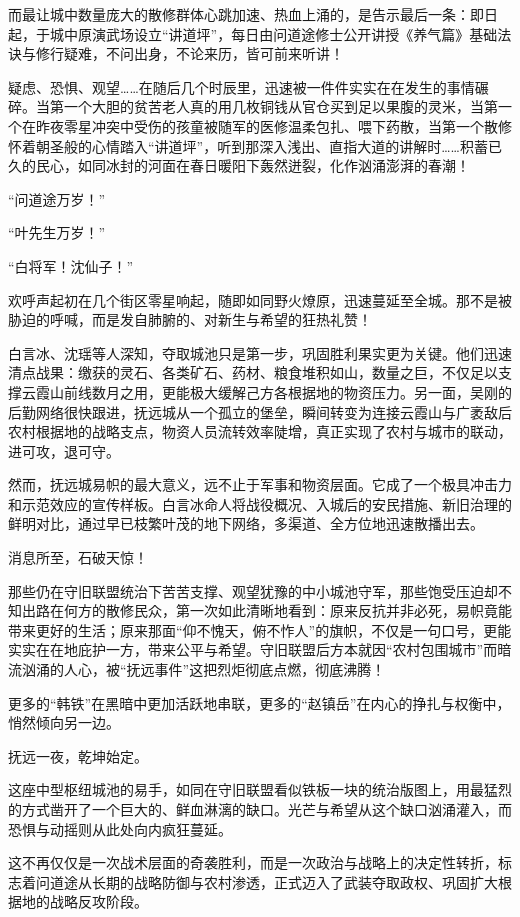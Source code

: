 而最让城中数量庞大的散修群体心跳加速、热血上涌的，是告示最后一条：即日起，于城中原演武场设立“讲道坪”，每日由问道途修士公开讲授《养气篇》基础法诀与修行疑难，不问出身，不论来历，皆可前来听讲！

疑虑、恐惧、观望……在随后几个时辰里，迅速被一件件实实在在发生的事情碾碎。当第一个大胆的贫苦老人真的用几枚铜钱从官仓买到足以果腹的灵米，当第一个在昨夜零星冲突中受伤的孩童被随军的医修温柔包扎、喂下药散，当第一个散修怀着朝圣般的心情踏入“讲道坪”，听到那深入浅出、直指大道的讲解时……积蓄已久的民心，如同冰封的河面在春日暖阳下轰然迸裂，化作汹涌澎湃的春潮！

“问道途万岁！”

“叶先生万岁！”

“白将军！沈仙子！”

欢呼声起初在几个街区零星响起，随即如同野火燎原，迅速蔓延至全城。那不是被胁迫的呼喊，而是发自肺腑的、对新生与希望的狂热礼赞！

白言冰、沈瑶等人深知，夺取城池只是第一步，巩固胜利果实更为关键。他们迅速清点战果：缴获的灵石、各类矿石、药材、粮食堆积如山，数量之巨，不仅足以支撑云霞山前线数月之用，更能极大缓解己方各根据地的物资压力。另一面，吴刚的后勤网络很快跟进，抚远城从一个孤立的堡垒，瞬间转变为连接云霞山与广袤敌后农村根据地的战略支点，物资人员流转效率陡增，真正实现了农村与城市的联动，进可攻，退可守。

然而，抚远城易帜的最大意义，远不止于军事和物资层面。它成了一个极具冲击力和示范效应的宣传样板。白言冰命人将战役概况、入城后的安民措施、新旧治理的鲜明对比，通过早已枝繁叶茂的地下网络，多渠道、全方位地迅速散播出去。

消息所至，石破天惊！

那些仍在守旧联盟统治下苦苦支撑、观望犹豫的中小城池守军，那些饱受压迫却不知出路在何方的散修民众，第一次如此清晰地看到：原来反抗并非必死，易帜竟能带来更好的生活；原来那面“仰不愧天，俯不怍人”的旗帜，不仅是一句口号，更能实实在在地庇护一方，带来公平与希望。守旧联盟后方本就因“农村包围城市”而暗流汹涌的人心，被“抚远事件”这把烈炬彻底点燃，彻底沸腾！

更多的“韩铁”在黑暗中更加活跃地串联，更多的“赵镇岳”在内心的挣扎与权衡中，悄然倾向另一边。

抚远一夜，乾坤始定。

这座中型枢纽城池的易手，如同在守旧联盟看似铁板一块的统治版图上，用最猛烈的方式凿开了一个巨大的、鲜血淋漓的缺口。光芒与希望从这个缺口汹涌灌入，而恐惧与动摇则从此处向内疯狂蔓延。

这不再仅仅是一次战术层面的奇袭胜利，而是一次政治与战略上的决定性转折，标志着问道途从长期的战略防御与农村渗透，正式迈入了武装夺取政权、巩固扩大根据地的战略反攻阶段。

